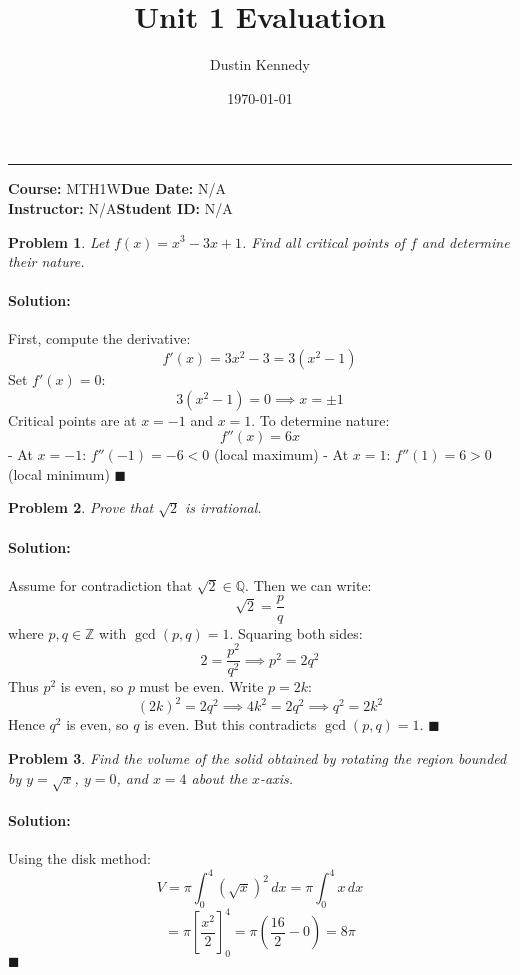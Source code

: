 \documentclass[12pt, letterpaper]{article}
\title{\textbf{Unit 1 Evaluation}}
\author{Dustin Kennedy}
\date{\today}
\newtheorem{problem}{Problem}
\newenvironment{solution}{\paragraph{\textbf{Solution:}}}{\hfill$\blacksquare$}
\newcommand{\Q}{\mathbb{Q}}
\newcommand{\Z}{\mathbb{Z}}
\newcommand{\course}{MTH1W}
\newcommand{\instructor}{N/A}
\begin{document}
\maketitle
\hrule
\vspace{0.5cm}
\textbf{Course:} \course \hfill \textbf{Due Date:} N/A \\
\textbf{Instructor:} \instructor \hfill \textbf{Student ID:} N/A
\vspace{1cm}

\begin{problem}
  Let $f(x) = x^3 - 3x + 1$. Find all critical points of $f$ and determine their nature.
\end{problem}

\begin{solution}
  First, compute the derivative:
  \[
    f'(x) = 3x^2 - 3 = 3(x^2 - 1)
  \]
  Set $f'(x) = 0$:
  \[
    3(x^2 - 1) = 0 \implies x = \pm 1
  \]
  Critical points are at $x = -1$ and $x = 1$. To determine nature:
  \[
    f''(x) = 6x
  \]
  - At $x = -1$: $f''(-1) = -6 < 0$ (local maximum)
  - At $x = 1$: $f''(1) = 6 > 0$ (local minimum)
\end{solution}

\begin{problem}
  Prove that $\sqrt{2}$ is irrational.
\end{problem}

\begin{solution}
  Assume for contradiction that $\sqrt{2} \in \Q$. Then we can write:
  \[
    \sqrt{2} = \frac{p}{q}
  \]
  where $p, q \in \Z$ with $\gcd(p,q) = 1$. Squaring both sides:
  \[
    2 = \frac{p^2}{q^2} \implies p^2 = 2q^2
  \]
  Thus $p^2$ is even, so $p$ must be even. Write $p = 2k$:
  \[
    (2k)^2 = 2q^2 \implies 4k^2 = 2q^2 \implies q^2 = 2k^2
  \]
  Hence $q^2$ is even, so $q$ is even. But this contradicts $\gcd(p,q) = 1$.
\end{solution}

\begin{problem}
  Find the volume of the solid obtained by rotating the region bounded by $y = \sqrt{x}$, $y = 0$, and $x = 4$ about the $x$-axis.
\end{problem}

\begin{solution}
  Using the disk method:
  \[
    V = \pi \int_{0}^{4} (\sqrt{x})^2 \,dx = \pi \int_{0}^{4} x \,dx
  \]
  \[
    = \pi \left[ \frac{x^2}{2} \right]_{0}^{4} = \pi \left( \frac{16}{2} - 0 \right) = 8\pi
  \]
\end{solution}

\end{document}
